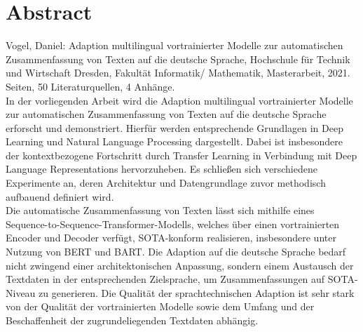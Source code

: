 \chapter*{Abstract}
\thispagestyle{empty}

\noindent
Vogel, Daniel: Adaption multilingual vortrainierter Modelle zur automatischen Zusammenfassung von Texten auf die deutsche Sprache, Hochschule für Technik und Wirtschaft Dresden, Fakultät Informatik/ Mathematik, Masterarbeit, 2021.\\[1ex]

 Seiten, 50 Literaturquellen, 4 Anhänge.\\[30ex]

\noindent
In der vorliegenden Arbeit wird die Adaption multilingual vortrainierter Modelle zur automatischen Zusammenfassung von Texten auf die deutsche Sprache erforscht und demonstriert. Hierfür werden entsprechende Grundlagen in Deep Learning und Natural Language Processing dargestellt. Dabei ist insbesondere der kontextbezogene Fortschritt durch Transfer Learning in Verbindung mit Deep Language Representations hervorzuheben. Es schließen sich verschiedene Experimente an, deren Architektur und Datengrundlage zuvor methodisch aufbauend definiert wird.\\

\noindent
Die automatische Zusammenfassung von Texten lässt sich mithilfe eines Sequence-to-Sequence-Transformer-Modells, welches über einen vortrainierten Encoder und Decoder verfügt, SOTA-konform realisieren, insbesondere unter Nutzung von BERT und BART. Die Adaption auf die deutsche Sprache bedarf nicht zwingend einer architektonischen Anpassung, sondern einem Austausch der Textdaten in der entsprechenden Zielsprache, um Zusammenfassungen auf SOTA-Niveau zu generieren. Die Qualität der sprachtechnischen Adaption ist sehr stark von der Qualität der vortrainierten Modelle sowie dem Umfang und der Beschaffenheit der zugrundeliegenden Textdaten abhängig.
